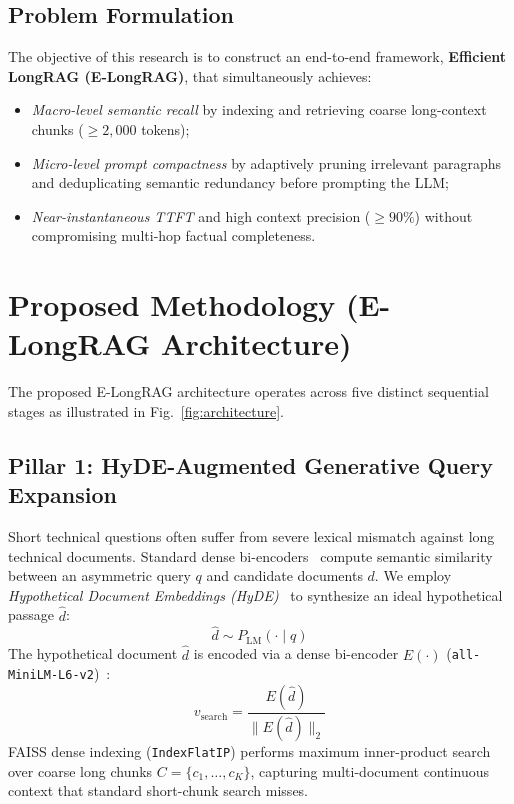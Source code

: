 \documentclass[10pt,journal,compsoc]{IEEEtran}
\begin{document}
\subsection{Problem Formulation}
The objective of this research is to construct an end-to-end framework, \textbf{Efficient LongRAG (E-LongRAG)}, that simultaneously achieves:
\begin{itemize}
    \item \textit{Macro-level semantic recall} by indexing and retrieving coarse long-context chunks ($\ge 2,000$ tokens);
    \item \textit{Micro-level prompt compactness} by adaptively pruning irrelevant paragraphs and deduplicating semantic redundancy before prompting the LLM;
    \item \textit{Near-instantaneous TTFT} and high context precision ($\ge 90\%$) without compromising multi-hop factual completeness.
\end{itemize}

\section{Proposed Methodology (E-LongRAG Architecture)}
The proposed E-LongRAG architecture operates across five distinct sequential stages as illustrated in Fig.~\ref{fig:architecture}.

\subsection{Pillar 1: HyDE-Augmented Generative Query Expansion}
Short technical questions often suffer from severe lexical mismatch against long technical documents. Standard dense bi-encoders~\cite{sbert} compute semantic similarity between an asymmetric query $q$ and candidate documents $d$. We employ \textit{Hypothetical Document Embeddings (HyDE)}~\cite{hyde} to synthesize an ideal hypothetical passage $\hat{d}$:
\begin{equation}
\hat{d} \sim P_{\text{LM}}(\cdot \mid q)
\end{equation}
The hypothetical document $\hat{d}$ is encoded via a dense bi-encoder $E(\cdot)$ (\texttt{all-MiniLM-L6-v2})~\cite{sbert}:
\begin{equation}
v_{\text{search}} = \frac{E(\hat{d})}{\|E(\hat{d})\|_2}
\end{equation}
FAISS dense indexing (\texttt{IndexFlatIP}) performs maximum inner-product search over coarse long chunks $C = \{c_1, \dots, c_K\}$, capturing multi-document continuous context that standard short-chunk search misses.
\end{document}
